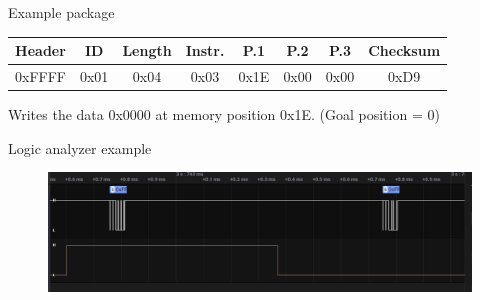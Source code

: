 \documentclass{beamer}
\begin{document}


\begin{frame}{Example package}

    \begin{table}
        \begin{flushleft}
            \begin{tabular}{| c | c | c | c | c | c | c | c |}
                \hline
                Header & ID & Length & Instr. & P.1 & P.2 & P.3 & Checksum\\
                \hline
                0xFFFF & 0x01 & 0x04 & 0x03 & 0x1E & 0x00 & 0x00 & 0xD9\\
                \hline
            \end{tabular}
        \end{flushleft}
    \end{table}
    Writes the data 0x0000 at memory position 0x1E. (Goal position = 0)
\end{frame}



\begin{frame}{Logic analyzer example}


        \begin{figure}
            \centering
            \includegraphics[width = \textwidth]{img/logic_1.PNG}

        \end{figure}
    
\end{frame}


\end{document}
